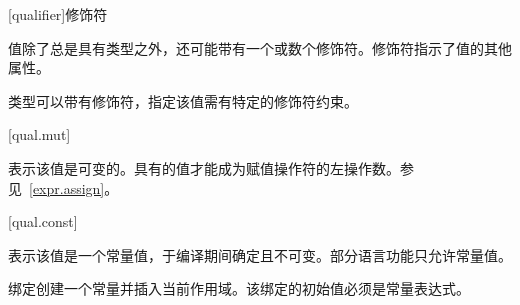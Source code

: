 [qualifier]{修饰符}

\pnum
值除了总是具有类型之外，还可能带有一个或数个修饰符。修饰符指示了值的其他属性。

\pnum
类型可以带有修饰符，指定该值需有特定的修饰符约束。

[qual.mut]{}

\pnum
{}表示该值是可变的。具有的值才能成为赋值操作符的左操作数。参见~\ref{expr.assign}。

[qual.const]{}

\pnum
{}表示该值是一个常量值，于编译期间确定且不可变。部分语言功能只允许常量值。

\pnum
{}绑定创建一个常量并插入当前作用域。该绑定的初始值必须是常量表达式。

